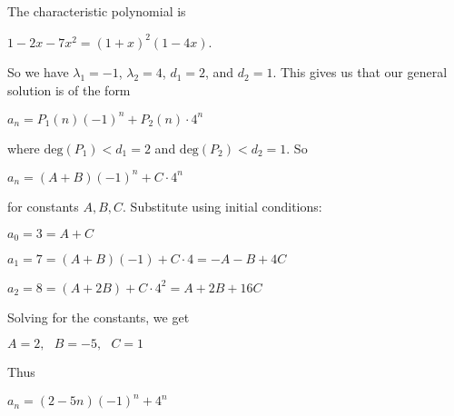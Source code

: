 \begin{enumerate}
    
     The characteristic polynomial is 
    \begin{center}
        $1 - 2x -7x^2 = (1 + x)^2(1 - 4x)$.
    \end{center}
     So we have $\lambda_1 = -1$, $\lambda_2 = 4$, $d_1 = 2$, and $d_2 = 1$. This gives us that our general solution is of the form 

    \begin{center}
        $a_n = P_1(n)(-1)^n + P_2(n) \cdot 4^n$
    \end{center}

    where $\mathrm{deg}(P_1) < d_1 = 2$ and $\mathrm{deg}(P_2) < d_2 = 1$. So

    \begin{center}
        $a_n = (A + B)(-1)^n + C \cdot 4^n$
    \end{center}

    for constants $A, B, C$. Substitute using initial conditions: 

    \begin{center}
        $a_0 = 3 = A + C$

        $a_1 = 7 = (A + B)(-1) + C\cdot 4 = -A -B + 4C$

        $a_2 = 8 = (A + 2B) + C\cdot 4^2 = A + 2B + 16C$
        
    \end{center}

Solving for the constants, we get

\begin{center}
    $A = 2,\ \ \ B = -5,\ \ \ C = 1$
\end{center}

Thus 

\begin{center}
    $a_n = (2 - 5n)(-1)^n + 4^n$
\end{center}

\end{enumerate}